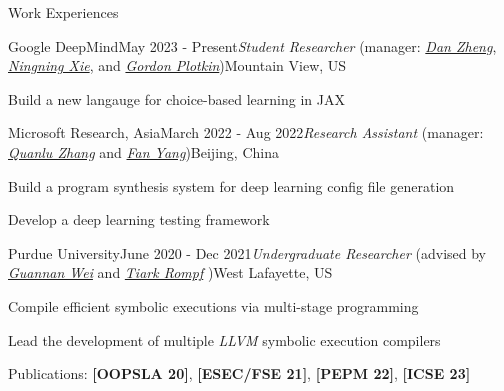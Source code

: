 \documentclass{resume} %
\begin{document}
\begin{rSection}{Work Experiences}
\begin{rSubsection}{Google DeepMind}{May 2023 - Present}{\textit{Student Researcher} (manager: \href{https://danzheng.me/}{\textit{Dan Zheng}}, \href{https://xnning.github.io/}{\textit{Ningning Xie}}, and \href{https://en.wikipedia.org/wiki/Gordon_Plotkin}{\textit{Gordon Plotkin}})}{Mountain View, US}
    \item Build a new langauge for choice-based learning in JAX
\end{rSubsection}

\begin{rSubsection}{Microsoft Research, Asia}{March 2022 - Aug 2022}{\textit{Research Assistant} (manager: \href{https://www.microsoft.com/en-us/research/people/quzha/}{\textit{Quanlu Zhang}} and \href{https://www.microsoft.com/en-us/research/people/fanyang/}{\textit{Fan Yang}})}{Beijing, China}
    \item Build a program synthesis system for deep learning config file generation
    \item Develop a deep learning testing framework
\end{rSubsection}


\begin{rSubsection}{Purdue University}{June 2020 - Dec 2021}{\textit{Undergraduate Researcher} (advised by \href{http://continuation.passing.style/}{\textit{Guannan Wei}} and \href{http://tiarkrompf.github.io/}{\textit{Tiark Rompf}} )}{West Lafayette, US}
\item Compile efficient symbolic executions via multi-stage programming
\item Lead the development of multiple \textit{LLVM} symbolic execution compilers
\item Publications: \textbf{[OOPSLA 20]}, \textbf{[ESEC/FSE 21]}, \textbf{[PEPM 22]}, \textbf{[ICSE 23]}

\end{rSubsection}

\end{rSection}


\end{document}
